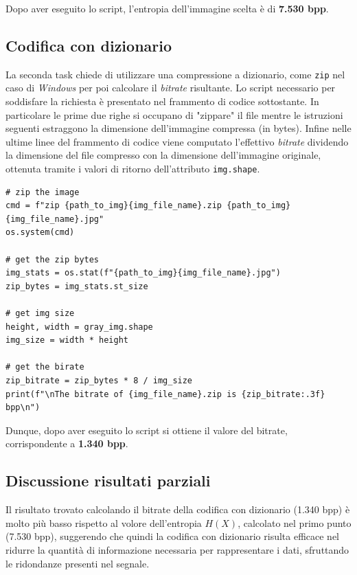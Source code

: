 \noindent Dopo aver eseguito lo script, l'entropia dell'immagine scelta è di \textbf{7.530 bpp}.





\vspace{15px}\subsection{Codifica con dizionario}
La seconda task chiede di utilizzare una compressione a dizionario, come \texttt{zip} nel caso di \textsl{Windows} per poi calcolare il \textsl{bitrate} risultante. Lo script necessario per soddisfare la richiesta è presentato nel frammento di codice sottostante. In particolare le prime due righe si occupano di "zippare" il file mentre le istruzioni seguenti estraggono la dimensione dell'immagine compressa (in bytes). Infine nelle ultime linee del frammento di codice viene computato l'effettivo \textsl{bitrate} dividendo la dimensione del file compresso con la dimensione dell'immagine originale, ottenuta tramite i valori di ritorno dell'attributo \texttt{img.shape}.

\begin{lstlisting}
# zip the image
cmd = f"zip {path_to_img}{img_file_name}.zip {path_to_img}{img_file_name}.jpg"
os.system(cmd)

# get the zip bytes
img_stats = os.stat(f"{path_to_img}{img_file_name}.jpg")
zip_bytes = img_stats.st_size

# get img size
height, width = gray_img.shape
img_size = width * height

# get the birate
zip_bitrate = zip_bytes * 8 / img_size 
print(f"\nThe bitrate of {img_file_name}.zip is {zip_bitrate:.3f} bpp\n")
    \end{lstlisting}

\noindent Dunque, dopo aver eseguito lo script si ottiene il valore del bitrate, corrispondente a \textbf{1.340 bpp}. 



\vspace{15px}\subsection{Discussione risultati parziali}
Il risultato trovato calcolando il bitrate della codifica con dizionario (1.340 bpp) è molto più basso rispetto al volore dell'entropia $H(X)$, calcolato nel primo punto (7.530 bpp), suggerendo che quindi la codifica con dizionario risulta efficace nel ridurre la quantità di informazione necessaria per rappresentare i dati, sfruttando le ridondanze presenti nel segnale.




